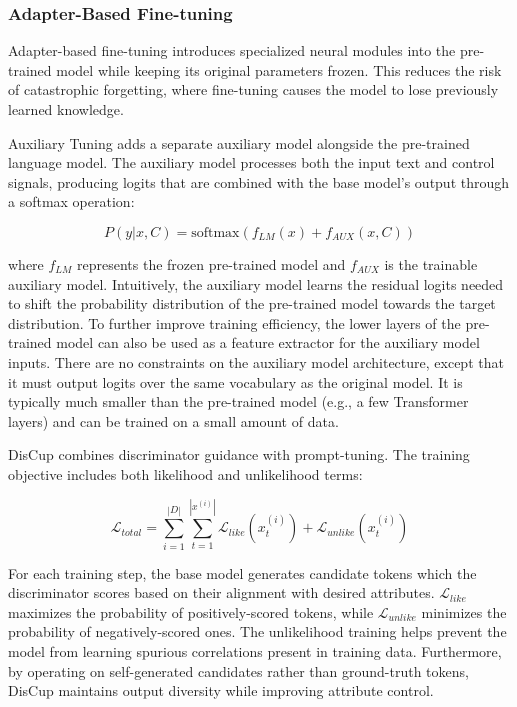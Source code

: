 \subsubsection{Adapter-Based Fine-tuning}

Adapter-based fine-tuning introduces specialized neural modules into the pre-trained model while keeping its original parameters frozen. This reduces the risk of catastrophic forgetting, where fine-tuning causes the model to lose previously learned knowledge.

Auxiliary Tuning \cite{zeldes2020technicalreportauxiliarytuning} adds a separate auxiliary model alongside the pre-trained language model. 
The auxiliary model processes both the input text and control signals, producing logits that are combined with the base model's output through a softmax operation:

\begin{equation}
    P(y|x,C) = \text{softmax}(f_{LM}(x) + f_{AUX}(x,C))
\end{equation}

where $f_{LM}$ represents the frozen pre-trained model and $f_{AUX}$ is the trainable auxiliary model. 
Intuitively, the auxiliary model learns the residual logits needed to shift the probability distribution of the pre-trained model towards the target distribution.
To further improve training efficiency, the lower layers of the pre-trained model can also be used as a feature extractor for the auxiliary model inputs. 
There are no constraints on the auxiliary model architecture, except that it must output logits over the same vocabulary as the original model.
It is typically much smaller than the pre-trained model (e.g., a few Transformer layers) and can be trained on a small amount of data.

DisCup \cite{zhang2022discupdiscriminatorcooperativeunlikelihood} combines discriminator guidance with prompt-tuning.
The training objective includes both likelihood and unlikelihood terms:

\begin{equation}
    \mathcal{L}_{total} = \sum_{i=1}^{|D|} \sum_{t=1}^{|x^{(i)}|} \mathcal{L}_{like}(x_t^{(i)}) + \mathcal{L}_{unlike}(x_t^{(i)})
\end{equation}

For each training step, the base model generates candidate tokens which the discriminator scores based on their alignment with desired attributes. 
$\mathcal{L}_{like}$ maximizes the probability of positively-scored tokens, while $\mathcal{L}_{unlike}$ minimizes the probability of negatively-scored ones. 
The unlikelihood training helps prevent the model from learning spurious correlations present in training data.
Furthermore, by operating on self-generated candidates rather than ground-truth tokens, DisCup maintains output diversity while improving attribute control.

